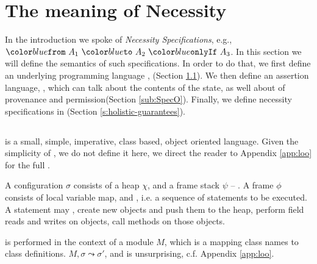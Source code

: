 \section{The meaning of Necessity}
\label{s:semantics}

In the introduction we spoke of \emph{Necessity Specifications}, e.g., $\onlyIf {A_1} {A_2} {A_3}$. 
In this section we will define the semantics of such specifications.
In order to do that, we first define 
an underlying programming language \Loo, (Section \ref{sub:Loo}).
We then  define an assertion language, \SpecO,  which can talk about
 the contents of the state, as well about 
  of provenance and permission(Section \ref{sub:SpecO}).
Finally, we define necessity specifications in \Chainmail (Section \ref{s:holistic-guarantees}).
\sophia[added]{} 



\subsection{\Loo}
\label{sub:Loo} 
 \Loo is a small, simple, imperative,
class based, object oriented language. 
Given the simplicity of \Loo, we do not
define it here,  we direct the reader to Appendix \ref{app:loo} for 
the full . %

A \Loo configuration $\sigma$ consists of a 
heap $\chi$, and a frame stack $\psi$ --
.    
A frame $\phi$ consists of
local variable map, and , i.e. a sequence of statements to be executed.
 A statement may , create new objects and push them to the heap, 
perform field reads and writes on objects,  
 call methods on those objects. 

 is performed in the context of a module $M$,
which is a mapping
 class names to class definitions. 
  $M, \sigma \leadsto \sigma'$, and is
unsurprising,  c.f. Appendix \ref{app:loo}.
 
